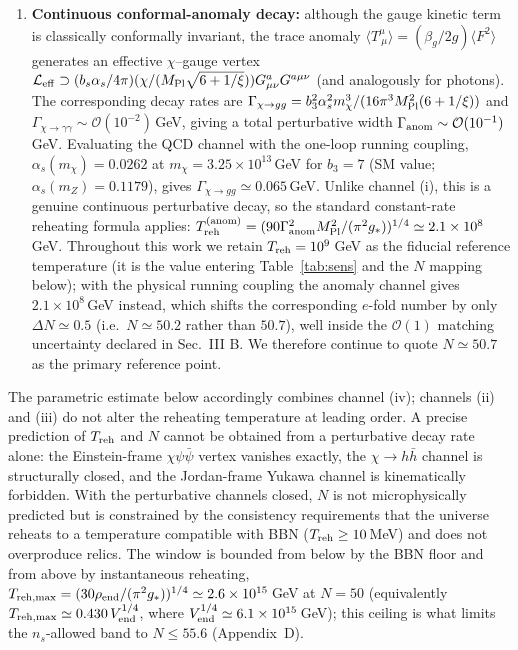\documentclass[pdflatex,sn-mathphys-num]{sn-jnl}
\newcommand{\MP}{M_{\rm Pl}}
\theoremstyle{thmstyleone}
\begin{document}
\begin{enumerate}
\item[(iv)] \textbf{Continuous conformal-anomaly decay:} although the gauge kinetic term is classically conformally invariant, the trace anomaly $\langle T^\mu_{\ \mu}\rangle=(\beta_g/2g)\langle F^2\rangle$ generates an effective $\chi$--gauge vertex $\mathcal{L}_{\rm eff}\supset(b_s\alpha_s/4\pi)(\chi/(\MP\sqrt{6+1/\xi}))G^a_{\mu\nu}G^{a\mu\nu}$ (and analogously for photons). The corresponding decay rates are $\Gamma_{\chi\to gg}=b_3^2\alpha_s^2 m_\chi^3/(16\pi^3\MP^2(6+1/\xi))$ and $\Gamma_{\chi\to\gamma\gamma}\sim\mathcal{O}(10^{-2})\,$GeV, giving a total perturbative width $\Gamma_{\rm anom}\sim\mathcal{O}(10^{-1})\,$GeV. Evaluating the QCD channel with the one-loop running coupling, $\alpha_s(m_\chi)=0.0262$ at $m_\chi=3.25\times10^{13}\,$GeV for $b_3=7$ (SM value; $\alpha_s(m_Z)=0.1179$), gives $\Gamma_{\chi\to gg}\simeq0.065\,$GeV. Unlike channel (i), this is a genuine continuous perturbative decay, so the standard constant-rate reheating formula applies: $T_{\rm reh}^{\rm (anom)}=(90\Gamma_{\rm anom}^2\MP^2/(\pi^2 g_*))^{1/4}\simeq2.1\times10^8\,$GeV. Throughout this work we retain $T_{\rm reh}=10^9\,$GeV as the fiducial reference temperature (it is the value entering Table~\ref{tab:sens} and the $N$ mapping below); with the physical running coupling the anomaly channel gives $2.1\times10^8\,$GeV instead, which shifts the corresponding $e$-fold number by only $\Delta N\simeq0.5$ (i.e.\ $N\simeq50.2$ rather than $50.7$), well inside the $\mathcal{O}(1)$ matching uncertainty declared in Sec.~III B. We therefore continue to quote $N\simeq50.7$ as the primary reference point.
\end{enumerate}

The parametric estimate below accordingly combines channel (iv); channels (ii) and (iii) do not alter the reheating temperature at leading order. A precise prediction of $T_{\rm reh}$ and $N$ cannot be obtained from a perturbative decay rate alone: the Einstein-frame $\chi\psi\bar\psi$ vertex vanishes exactly, the $\chi\to h\bar h$ channel is structurally closed, and the Jordan-frame Yukawa channel is kinematically forbidden. With the perturbative channels closed, $N$ is not microphysically predicted but is constrained by the consistency requirements that the universe reheats to a temperature compatible with BBN ($T_{\rm reh}\geq10\,$MeV) and does not overproduce relics. The window is bounded from below by the BBN floor and from above by instantaneous reheating, $T_{\rm reh,max}=(30\rho_{\rm end}/(\pi^2g_*))^{1/4}\simeq2.6\times10^{15}\,$GeV at $N=50$ (equivalently $T_{\rm reh,max}\simeq0.430\,V_{\rm end}^{1/4}$, where $V_{\rm end}^{1/4}\simeq6.1\times10^{15}\,$GeV); this ceiling is what limits the $n_s$-allowed band to $N\leq55.6$ (Appendix~D).
\end{document}
